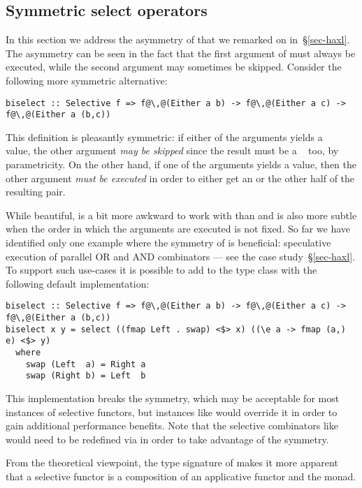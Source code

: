 \subsection{Symmetric select operators}\label{sec-alt-symmetric}

In this section we address the asymmetry of  that we remarked on
in~\S\ref{sec-haxl}. The asymmetry can be seen in the fact that the first
argument of  must always be executed, while the second argument may
sometimes be skipped. Consider the following more symmetric alternative:

\vspace{1mm}
\begin{verbatim}
biselect :: Selective f => f@\,@(Either a b) -> f@\,@(Either a c) -> f@\,@(Either a (b,c))
\end{verbatim}
\vspace{1mm}

\noindent
This definition is pleasantly symmetric: if either of the arguments yields a
~ value, the other argument \emph{may be skipped} since the
result must be a ~ too, by parametricity. On the other hand, if
one of the arguments yields a  value, then the other argument
\emph{must be executed} in order to either get an  or the other half of
the resulting pair.

While beautiful,  is a bit more awkward to work with than
 and is also more subtle when the order in which the arguments are
executed is not fixed. So far we have identified only one example where the
symmetry of  is beneficial: speculative execution of parallel OR
and AND combinators --- see the \Haxl case study~\S\ref{sec-haxl}. To support
such use-cases it is possible to add  to the  type
class with the following default implementation:

\vspace{1mm}
\begin{verbatim}
biselect :: Selective f => f@\,@(Either a b) -> f@\,@(Either a c) -> f@\,@(Either a (b,c))
biselect x y = select ((fmap Left . swap) <$> x) ((\e a -> fmap (a,) e) <$> y)
  where
    swap (Left  a) = Right a
    swap (Right b) = Left  b
\end{verbatim}
\vspace{1mm}

\noindent
This implementation breaks the symmetry, which may be acceptable for most
instances of selective functors, but instances like  would override it
in order to gain additional performance benefits. Note that the selective
combinators like \hs{<||>} would need to be redefined via  in order
to take advantage of the symmetry.

From the theoretical viewpoint, the type signature of  makes it
more apparent that a selective functor  is a composition of an applicative
functor  and the  monad.


